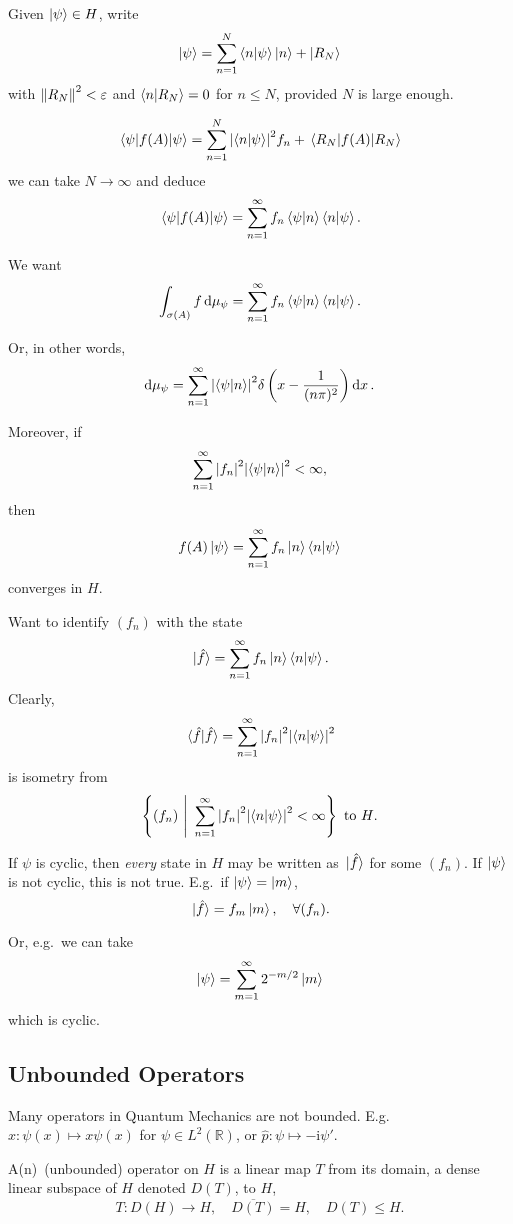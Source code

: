 \documentclass[a4paper,11pt]{article}
\begin{document}
	Given $\ket{\psi} \in H$, write 
	\[
		\ket{\psi} = \sum _{n = 1}^{N} \braket{n}{\psi} \ket{n} + \ket{R_N}
	\]
	with $\norm{R_N}^2 < \varepsilon$ and $\braket{n}{R_N} = 0$ for $n \leq N$, provided $N$ is large enough.
	
	\[
		\mel{\psi}{f(A)}{\psi} = \sum _{n = 1}^{N} \abs{\braket{n}{\psi}}^2 f_n + \mel{R_N}{f(A)}{R_N}
	\]
	we can take $N \to \infty$ and deduce
	\[
		\mel{\psi}{f(A)}{\psi} = \sum _{n = 1}^{\infty} f_n \braket{\psi}{n} \braket{n}{\psi}.
	\]
	
	We want 
	\[
		\int _{\sigma(A)} f \dd{\mu_\psi} = \sum _{n = 1}^{\infty} f_n \braket{\psi}{n} \braket{n}{\psi}.
	\]

	Or, in other words,
	\[
		\dd{\mu_\psi} = \sum _{n = 1}^{\infty} \abs{\braket{\psi}{n}}^2 \delta \left( x - \frac{1}{(n \pi)^2} \right) \dd{x}.
	\]
	
	Moreover, if 
	\[
		\sum _{n = 1}^{\infty} \abs{f_n}^2 \abs{\braket{\psi}{n}}^2 < \infty,
	\]
	then
	\[
		f(A) \ket{\psi} = \sum _{ n = 1}^{\infty} f_n \ket{n} \braket{n}{\psi}
	\]
	converges in $H$.
	
	Want to identify $(f_n)$ with the state 
	\[
		\ket*{\hat f} = \sum _{n = 1}^{\infty} f_n \ket{n} \braket{n}{\psi}.
	\]
	Clearly,
	\[
		\braket*{\hat f}{\hat f} = \sum _{n=1}^{\infty}\abs{f_n}^2 \abs{\braket{n}{\psi}}^2
	\]
	is isometry from 
	\[
		\left\{ (f_n)\ \Bigg|\ \sum _{n=1}^{\infty}\abs{f_n}^2 \abs{\braket{n}{\psi}}^2 < \infty\right\} \text{ to $H$}.
	\]

	If $\psi$ is cyclic, then \emph{every} state in $H$ may be written as $\ket*{\hat f}$ for some $(f_n)$. If $\ket{\psi}$ is not cyclic, this is not true. E.g.\ if $\ket{\psi} = \ket{m}$, 
	\[
		\ket*{\hat f} = f_m \ket{m}, \quad \forall (f_n).
	\]

	Or, e.g.\ we can take
	\[
		\ket{\psi} = \sum _{m = 1}^{\infty} 2 ^{- m / 2} \ket{m}
	\]
	which is cyclic.
	
	\subsection{Unbounded Operators}
	Many operators in Quantum Mechanics are not bounded. E.g.\ $\hat x : \psi(x) \mapsto x \psi(x)$ for $\psi \in L^2(\mathbb{R})$, or $\hat p : \psi \mapsto - \mathrm{i} \psi'$. 

	A(n)\ (unbounded) operator on $H$ is a linear map $T$ from its domain, a dense linear subspace of $H$ denoted $D(T)$, to $H$, 
	\[
		T : D(H) \to H, \quad \overline{D(T)} = H, \quad D(T) \leq H.
	\]
	
\end{document}
